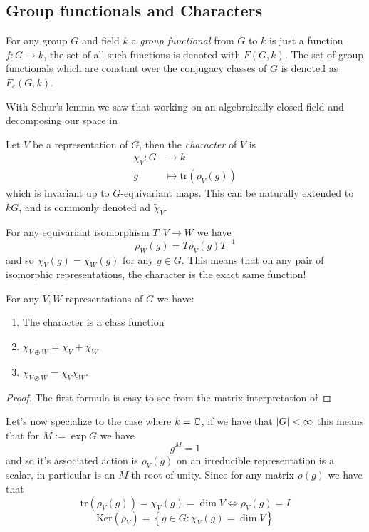 \documentclass[11pt]{scrartcl}
\newcommand{\tr}[1]{\text{tr}\!\left(#1\right)}
\renewcommand{\ker}[1]{\text{Ker}\left(#1\right)}
\begin{document}
	\subsection{Group functionals and Characters}
	\begin{definition}
		For any group $G$ and field $k$ a \textit{group functional} from $G$ to $k$ is just a function $f:G\to k$, the set of all such functions is denoted with $F(G,k)$. The set of group functionals which are constant over the conjugacy classes of $G$ is denoted as $F_c(G,k)$.
	\end{definition}
	
	With Schur's lemma we saw that working on an algebraically closed field and decomposing our space in 
	
	\begin{definition}[Character]
		Let $V$ be a representation of $G$, then the \textit{character} of $V$ is
		\begin{align*}
			\chi_V:G & \to k \\
			g & \mapsto \tr{\rho_V(g)}
		\end{align*}
		which is invariant up to $G$-equivariant maps. This can be naturally extended to $kG$, and is commonly denoted ad $\tilde{\chi}_V$.
	\end{definition}
	\begin{remark}
		For any equivariant isomorphism $T:V\to W$ we have 
		$$\rho_W(g)=T\rho_V(g)T^{-1}$$
		and so $\chi_V(g)=\chi_W(g)$ for any $g\in G$. This means that on any pair of isomorphic representations, the character is the exact same function!
	\end{remark}
	\begin{proposition}
		For any $V,W$ representations of $G$ we have:
		\begin{enumerate}
			\item The character is a class function
			\item $\chi_{V\oplus W}=\chi_V+\chi_W$
			\item $\chi_{V\otimes W}=\chi_V\chi_W$.
		\end{enumerate}
	\end{proposition}
	\begin{proof}
		The first formula is easy to see from the matrix interpretation of 
	\end{proof}
	Let's now specialize to the case where $k=\mathbb C$, if we have that $\left\lvert G \right\rvert<\infty$ this means that for $M:=\exp G$ we have 
	$$g^M=1$$
	and so it's associated action is $\rho_V(g)$ on an irreducible representation is a scalar, in particular is an $M$-th root of unity. Since for any matrix $\rho(g)$ we have that
	$$\tr{\rho_V(g)}=\chi_V(g)=\dim V \iff \rho_V(g)=I$$
	$$\ker{\rho_V}=\left\{g\in G:\chi_V(g)=\dim V\right\}$$
	
\end{document}
